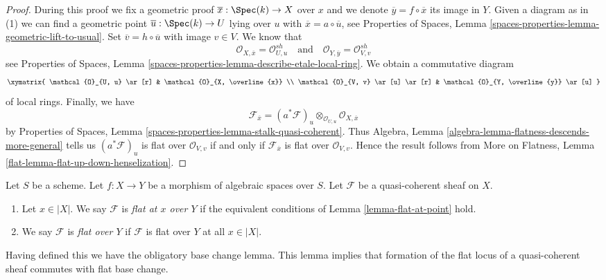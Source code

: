 \begin{proof}
During this proof we fix a geometric proof
$\overline{x} : \Spec(k) \to X$ over $x$ and
we denote $\overline{y} = f \circ \overline{x}$ its image in $Y$.
Given a diagram as in (1) we can find a geometric point
$\overline{u} : \Spec(k) \to U$ lying over $u$ with
$\overline{x} = a \circ \overline{u}$, see
Properties of Spaces, Lemma
\ref{spaces-properties-lemma-geometric-lift-to-usual}.
Set $\overline{v} = h \circ \overline{u}$ with image $v \in V$.
We know that
$$
\mathcal{O}_{X, \overline{x}} = \mathcal{O}_{U, u}^{sh}
\quad\text{and}\quad
\mathcal{O}_{Y, \overline{y}} = \mathcal{O}_{V, v}^{sh}
$$
see
Properties of Spaces, Lemma
\ref{spaces-properties-lemma-describe-etale-local-ring}.
We obtain a commutative diagram
$$
\xymatrix{
\mathcal{O}_{U, u} \ar[r] &
\mathcal{O}_{X, \overline{x}} \\
\mathcal{O}_{V, v} \ar[u] \ar[r] &
\mathcal{O}_{Y, \overline{y}} \ar[u]
}
$$
of local rings. Finally, we have
$$
\mathcal{F}_{\overline{x}} =
(a^*\mathcal{F})_u \otimes_{\mathcal{O}_{U, u}}
\mathcal{O}_{X, \overline{x}}
$$
by
Properties of Spaces, Lemma \ref{spaces-properties-lemma-stalk-quasi-coherent}.
Thus
Algebra, Lemma \ref{algebra-lemma-flatness-descends-more-general}
tells us $(a^*\mathcal{F})_u$ is flat over $\mathcal{O}_{V, v}$
if and only if $\mathcal{F}_{\overline{x}}$ is flat over $\mathcal{O}_{V, v}$.
Hence the result follows from
More on Flatness, Lemma \ref{flat-lemma-flat-up-down-henselization}.
\end{proof}

\begin{definition}
\label{definition-flat-module}
Let $S$ be a scheme.
Let $f : X \to Y$ be a morphism of algebraic spaces over $S$.
Let $\mathcal{F}$ be a quasi-coherent sheaf on $X$.
\begin{enumerate}
\item Let $x \in |X|$. We say $\mathcal{F}$ is {\it flat at $x$ over $Y$}
if the equivalent conditions of
Lemma \ref{lemma-flat-at-point}
hold.
\item We say $\mathcal{F}$ is {\it flat over $Y$} if $\mathcal{F}$ is
flat over $Y$ at all $x \in |X|$.
\end{enumerate}
\end{definition}

\noindent
Having defined this we have the obligatory base change lemma.
This lemma implies that formation of the flat locus of a quasi-coherent
sheaf commutes with flat base change.

